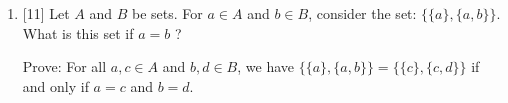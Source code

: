 \documentclass[12pt]{article}
\begin{document}
\begin{enumerate}

\item{[11]}   Let $A$ and $B$ be sets.
  For $a\in A$ and $b\in B$, consider the set: $\{\{a\},\{a,b\}\}$.
  What is this set if $a=b$ ?
  
  Prove:  For all $a,c\in A$ and $b,d\in B$, we have 
  $\{\{a\},\{a,b\}\} = \{\{c\},\{c,d\}\}$ if and only if
  $a=c$ and $b=d$.
 

\end{enumerate}
\end{document}
